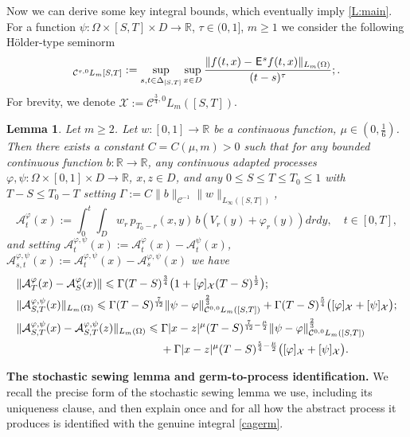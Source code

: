 \documentclass[12pt]{article}
\newtheorem{lemma}[theorem]{Lemma}
\theoremstyle{definition}
\DeclareMathOperator{\1}{\mathbbm{1}}%
\def\E{\hskip.15ex\mathsf{E}\hskip.10ex}
\def\phi{\varphi}
\renewcommand{\ge}{\geqslant}
\renewcommand{\le}{\leqslant}
\newcommand{\nn}{\nonumber}
\newcommand{\A}{\mathcal{A}}
\newcommand{\C}{\mathcal{C}}
\newcommand{\R}{\mathbb{R}}
\newcommand{\X}{\mathcal{X}}
\begin{document}
Now we can derive some key integral bounds, which eventually imply \cref{L:main}. For a function $\psi\colon\Omega\times[S,T]\times D\to\R$, $\tau\in(0,1]$, $m\ge1$ we consider the following H\"older-type seminorm 
\begin{equation*}
[f]_{\C^{\tau,0}L_m{[S,T]}}:=\sup_{s,t\in \Delta_{[S,T]}}\sup_{x\in D}\frac{\|f(t,x)-\E^s f(t,x)\|_{L_m(\Omega)}}{(t-s)^\tau};\label{norm1}. 
\end{equation*}
For brevity, we denote $\X:=\C^{\frac34,0}L_m([S,T])$.
\begin{lemma}\label{L26}
Let $m\ge2$. Let $w\colon[0,1]\to\R$ be a continuous function, $\mu\in(0,\frac16)$. 
Then there exists a constant $C=C(\mu,m)>0$ such that for any bounded continuous function $b\colon\R\to\R$, any continuous adapted processes  $\phi,\psi\colon\Omega\times[0,1]\times D\to\R$, $x,z\in D$, and any $0\le S\le T\le T_0\le 1$ with  $T-S\le T_0-T$
setting  $\Gamma:=C \|b\|_{\C^{-1}}\|w\|_{L_\infty([S,T])}$,
\begin{equation}\label{cagerm}
\A_{t}^\phi(x):=\int_0^t \int_D w_r \, p_{T_0-r}(x,y) \, b( V_r(y)+\phi_r(y))d r d y,\quad t\in [0,T],
\end{equation}
and setting $\A^{\phi,\psi}_{t}(x):=\A^\phi_t(x)-\A^\psi_t(x)$, $\A^{\phi,\psi}_{s,t}(x):=\A^{\phi,\psi}_{t}(x)-\A^{\phi,\psi}_{s}(x)$ we have
\begin{align}\label{mainres} 
&\|\A^\phi_T(x)-\A^\phi_S(x)\|\le  \Gamma  (T-S)^{\frac34}\bigl(1+[\phi]_{\X}(T-S)^{\frac{1}2}\bigr);\\
&\| \A^{\phi,\psi}_{S,T}(x)\|_{L_m(\Omega)}\le  \Gamma (T-S)^{\frac7{12}}\|\psi-\phi\|^{\frac23}_{\C^{0,0}L_m([S,T])}+ \Gamma(T-S)^{\frac{5}4}\bigl([\phi]_{\X}+[\psi]_{\X}\bigr);\label{mainresdif} \\
&\|\A^{\phi,\psi}_{S,T}(x)-\A^{\phi,\psi}_{S,T}(z)\|_{L_m(\Omega)}\le  \Gamma |x-z|^\mu (T-S)^{\frac7{12}-\frac\mu2}\|\psi-\phi\|^{\frac23}_{\C^{0,0}L_m([S,T])}\nn\\
&\hspace{30ex}+ \Gamma |x-z|^\mu                                                                                                                                               (T-S)^{\frac{5}4-\frac\mu2}\bigl([\phi]_{\X}+[\psi]_{\X}\bigr) \label{holderex}. 
\end{align}
\end{lemma}


\medskip
\noindent\textbf{The stochastic sewing lemma and germ-to-process identification.}
We recall the precise form of the stochastic sewing lemma we use, including its
uniqueness clause, and then explain once and for all how the abstract process it
produces is identified with the genuine integral \eqref{cagerm}.
\end{document}
